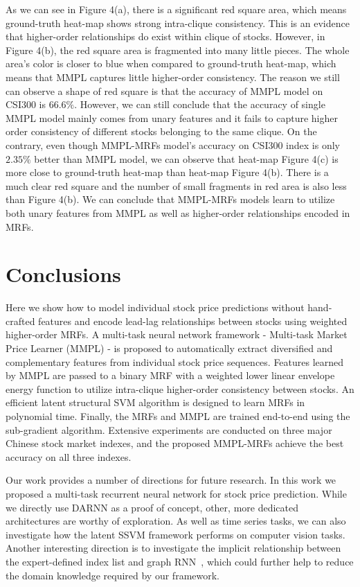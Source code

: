 As we can see in Figure 4(a), there is a significant red square
area, which means ground-truth heat-map shows strong intra-clique
consistency. This is an evidence that higher-order relationships
do exist within clique of stocks. However, in Figure 4(b), the red
square area is fragmented into many little pieces. The whole
area's color is closer to blue when compared to ground-truth
heat-map, which means that MMPL captures little higher-order consistency.
The reason we still can observe a shape of red square
is that the accuracy of MMPL model on CSI300 is $66.6\%$.
However, we can still conclude that the accuracy of single MMPL
model mainly comes from unary features and it fails to capture
higher order consistency of different stocks belonging to the same clique.
On the contrary, even though MMPL-MRFs model's accuracy on CSI300
index is only $2.35\%$ better than MMPL model, we can observe
that heat-map Figure 4(c) is more close to ground-truth heat-map than
heat-map Figure 4(b). There is a much clear red square and the number of
small fragments in red area is also less than Figure 4(b). We can
conclude that MMPL-MRFs models learn to utilize both unary
features from MMPL as well as higher-order relationships encoded
in MRFs.

\section{Conclusions}
\label{sec:conc}

Here we show how to model individual stock price predictions
without hand-crafted features and encode lead-lag relationships
between stocks using weighted higher-order MRFs. A multi-task
neural network framework - Multi-task Market Price Learner (MMPL)
- is proposed to automatically extract diversified and
complementary features from individual stock price sequences.
Features learned by MMPL are passed to a binary MRF with a
weighted lower linear envelope energy function to utilize
intra-clique higher-order consistency between stocks. An
efficient latent structural SVM algorithm is designed to learn
MRFs in polynomial time. Finally, the MRFs and MMPL are trained
end-to-end using the sub-gradient algorithm. Extensive
experiments are conducted on three major Chinese stock market
indexes, and the proposed MMPL-MRFs achieve the best accuracy on
all three indexes.

Our work provides a number of directions for future research. In
this work we proposed a multi-task recurrent neural network for
stock price prediction. While we directly use DARNN as a proof of
concept, other, more dedicated architectures are worthy of
exploration. As well as time series tasks, we can also
investigate how the latent SSVM framework performs on computer
vision tasks. Another interesting direction is to investigate the
implicit relationship between the expert-defined index list and
graph RNN~\cite{you2018graphrnn}, which could further help to
reduce the domain knowledge required by our framework.


